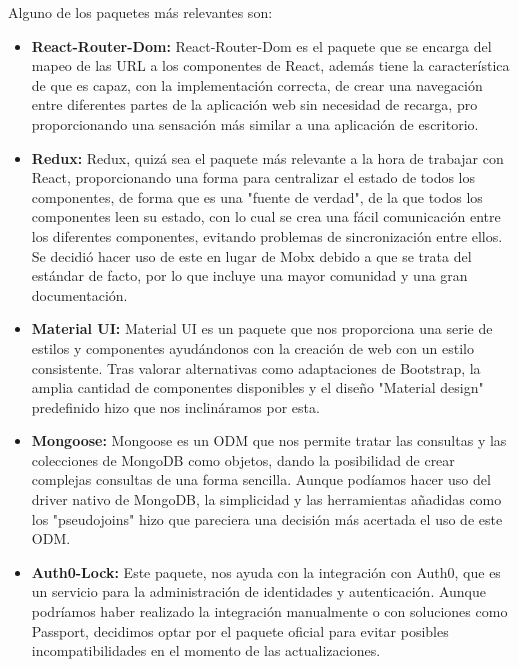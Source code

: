 Alguno de los paquetes más relevantes son:
\begin{itemize}
  \item \textbf{React-Router-Dom:} React-Router-Dom es el paquete que se encarga del mapeo de las URL a los componentes de React, además tiene la característica de que es capaz, con la implementación correcta, de crear una navegación entre diferentes partes de la aplicación web sin necesidad de recarga, pro
proporcionando una sensación más similar a una aplicación de escritorio.

  \item \textbf{Redux:} Redux, quizá sea el paquete más relevante a la hora de trabajar con React, proporcionando una forma para centralizar el estado de todos los componentes, de forma que es una "fuente de verdad", de la que todos los componentes leen su estado, con lo cual se crea una fácil comunicación entre los diferentes componentes, evitando problemas de sincronización entre ellos. Se decidió hacer uso de este en lugar de Mobx debido a que se trata del estándar de facto, por lo que incluye una mayor comunidad y una gran documentación.
  
  \item \textbf{Material UI:} Material UI es un paquete que nos proporciona una serie de estilos y componentes ayudándonos con la creación de web con un estilo consistente. Tras valorar alternativas como adaptaciones de Bootstrap, la amplia cantidad de componentes disponibles y el diseño "Material design" predefinido hizo que nos inclináramos por esta.
  
  \item \textbf{Mongoose:} Mongoose es un \gls{ODM} que nos permite tratar las consultas y las colecciones de MongoDB como objetos, dando la posibilidad de crear complejas consultas de una forma sencilla. Aunque podíamos hacer uso del \gls{driver} nativo de MongoDB, la simplicidad y las herramientas añadidas como los "\gls{pseudojoins}" hizo que pareciera una decisión más acertada el uso de este ODM.
  
  \item \textbf{Auth0-Lock:} Este paquete, nos ayuda con la integración con Auth0, que es un servicio para la administración de identidades y autenticación. Aunque podríamos haber realizado la integración manualmente o con soluciones como Passport, decidimos optar por el paquete oficial para evitar posibles incompatibilidades en el momento de las actualizaciones.
  
\end{itemize}
